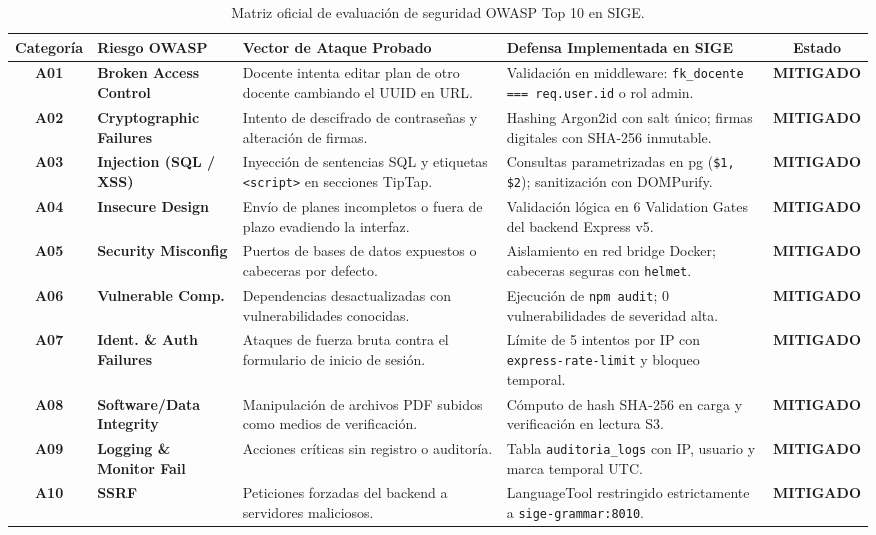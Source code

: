 \documentclass[12pt,a4paper]{article}
\begin{document}
\begin{table}[H]
\centering
\small
\renewcommand{\arraystretch}{1.15}
\begin{tabularx}{\textwidth}{|c|>{\raggedright\arraybackslash\bfseries}m{3.2cm}|X|X|c|}
\hline
\rowcolor{tableheader}
\textbf{Categoría} & \textbf{Riesgo OWASP} & \textbf{Vector de Ataque Probado} & \textbf{Defensa Implementada en SIGE} & \textbf{Estado} \\
\hline
\textbf{A01} & Broken Access Control & Docente intenta editar plan de otro docente cambiando el UUID en URL. & Validación en middleware: \texttt{fk\_docente === req.user.id} o rol admin. & \textbf{MITIGADO} \\
\hline
\textbf{A02} & Cryptographic Failures & Intento de descifrado de contraseñas y alteración de firmas. & Hashing Argon2id con salt único; firmas digitales con SHA-256 inmutable. & \textbf{MITIGADO} \\
\hline
\textbf{A03} & Injection (SQL / XSS) & Inyección de sentencias SQL y etiquetas \texttt{<script>} en secciones TipTap. & Consultas parametrizadas en pg (\texttt{\$1, \$2}); sanitización con DOMPurify. & \textbf{MITIGADO} \\
\hline
\textbf{A04} & Insecure Design & Envío de planes incompletos o fuera de plazo evadiendo la interfaz. & Validación lógica en 6 Validation Gates del backend Express v5. & \textbf{MITIGADO} \\
\hline
\textbf{A05} & Security Misconfig & Puertos de bases de datos expuestos o cabeceras por defecto. & Aislamiento en red bridge Docker; cabeceras seguras con \texttt{helmet}. & \textbf{MITIGADO} \\
\hline
\textbf{A06} & Vulnerable Comp. & Dependencias desactualizadas con vulnerabilidades conocidas. & Ejecución de \texttt{npm audit}; 0 vulnerabilidades de severidad alta. & \textbf{MITIGADO} \\
\hline
\textbf{A07} & Ident. \& Auth Failures & Ataques de fuerza bruta contra el formulario de inicio de sesión. & Límite de 5 intentos por IP con \texttt{express-rate-limit} y bloqueo temporal. & \textbf{MITIGADO} \\
\hline
\textbf{A08} & Software/Data Integrity & Manipulación de archivos PDF subidos como medios de verificación. & Cómputo de hash SHA-256 en carga y verificación en lectura S3. & \textbf{MITIGADO} \\
\hline
\textbf{A09} & Logging \& Monitor Fail & Acciones críticas sin registro o auditoría. & Tabla \texttt{auditoria\_logs} con IP, usuario y marca temporal UTC. & \textbf{MITIGADO} \\
\hline
\textbf{A10} & SSRF & Peticiones forzadas del backend a servidores maliciosos. & LanguageTool restringido estrictamente a \texttt{sige-grammar:8010}. & \textbf{MITIGADO} \\
\hline
\end{tabularx}
\caption{Matriz oficial de evaluación de seguridad OWASP Top 10 en SIGE.}
\label{tab:owasp_matrix}
\end{table}
\end{document}
